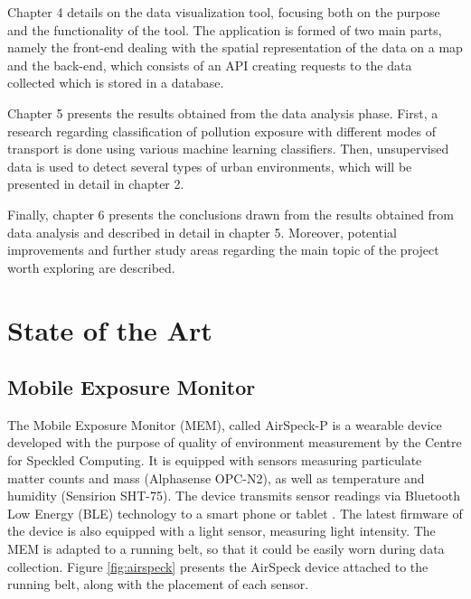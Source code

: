 \documentclass[bsc,frontabs,twoside,singlespacing,parskip,deptreport]{infthesis}     %
\begin{document}
Chapter 4 details on the data visualization tool, focusing both on the purpose and the functionality of the tool. The application is formed of two main parts, namely the front-end dealing with the spatial representation of the data on a map and the back-end, which consists of an API creating requests to the data collected which is stored in a database.

Chapter 5 presents the results obtained from the data analysis phase. First, a research regarding classification of pollution exposure with different modes of transport is done using various machine learning classifiers. Then, unsupervised data is used to detect several types of urban environments, which will be presented in detail in chapter 2.

Finally, chapter 6 presents the conclusions drawn from the results obtained from data analysis and described in detail in chapter 5. Moreover, potential improvements and further study areas regarding the main topic of the project worth exploring are described.

\chapter{State of the Art}

\section{Mobile Exposure Monitor}

The Mobile Exposure Monitor (MEM), called AirSpeck-P is a wearable device developed with the purpose of quality of environment measurement by the Centre for Speckled Computing. It is equipped with sensors measuring particulate matter counts and mass (Alphasense OPC-N2), as well as temperature and humidity (Sensirion SHT-75). The device transmits sensor readings via Bluetooth Low Energy (BLE) technology to a smart phone or tablet \cite{airspeck}. The latest firmware of the device is also equipped with a light sensor, measuring light intensity. The MEM is adapted to a running belt, so that it could be easily worn during data collection. Figure \ref{fig:airspeck} presents the AirSpeck device attached to the running belt, along with the placement of each sensor.
\end{document}
